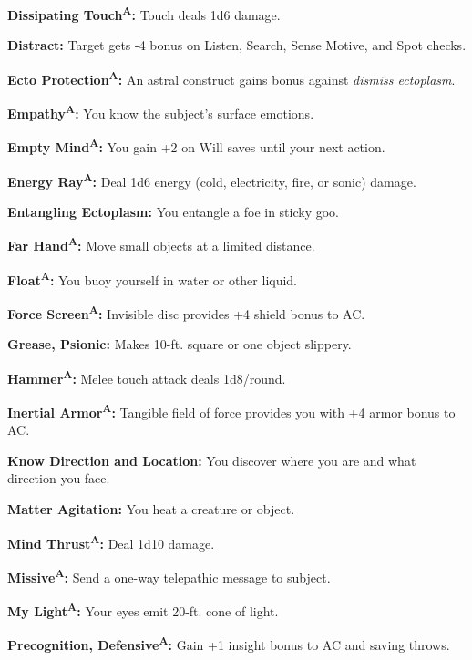 \documentclass{article}
\begin{document}
\textbf{Dissipating Touch}\textsuperscript{\textbf{A}}\textbf{: }Touch deals 1d6 
damage.

\textbf{Distract: }Target gets -4 bonus on Listen, Search, Sense Motive, and Spot 
checks.

\textbf{Ecto Protection}\textsuperscript{\textbf{A}}\textbf{: }An astral construct 
gains bonus against \textit{dismiss ectoplasm}.

\textbf{Empathy}\textsuperscript{\textbf{A}}\textbf{: }You know the subject's surface 
emotions.

\textbf{Empty Mind}\textsuperscript{\textbf{A}}\textbf{: }You gain +2 on Will saves 
until your next action.

\textbf{Energy Ray}\textsuperscript{\textbf{A}}\textbf{: }Deal 1d6 energy (cold, 
electricity, fire, or sonic) damage.

\textbf{Entangling Ectoplasm: }You entangle a foe in sticky goo. 

\textbf{Far Hand}\textsuperscript{\textbf{A}}\textbf{: }Move small objects at a 
limited distance. 

\textbf{Float}\textsuperscript{\textbf{A}}\textbf{: }You buoy yourself in water 
or other liquid.

\textbf{Force Screen}\textsuperscript{\textbf{A}}\textbf{: }Invisible disc provides 
+4 shield bonus to AC.

\textbf{Grease, Psionic: }Makes 10-ft. square or one object slippery.

\textbf{Hammer}\textsuperscript{\textbf{A}}\textbf{: }Melee touch attack deals 
1d8/round.

\textbf{Inertial Armor}\textsuperscript{\textbf{A}}\textbf{: }Tangible field of 
force provides you with +4 armor bonus to AC.

\textbf{Know Direction and Location: }You discover where you are and what direction 
you face.

\textbf{Matter Agitation: }You heat a creature or object.

\textbf{Mind Thrust}\textsuperscript{\textbf{A}}\textbf{: }Deal 1d10 damage.

\textbf{Missive}\textsuperscript{\textbf{A}}\textbf{: }Send a one-way telepathic 
message to subject.

\textbf{My Light}\textsuperscript{\textbf{A}}\textbf{: }Your eyes emit 20-ft. cone 
of light.

\textbf{Precognition, Defensive}\textsuperscript{\textbf{A}}\textbf{: }Gain +1 
insight bonus to AC and saving throws.
\end{document}
